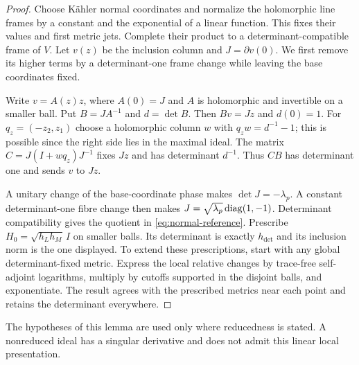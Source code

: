 \begin{proof}
Choose K\"ahler normal coordinates and normalize the
holomorphic line frames by a constant and the exponential of a
linear function. This fixes their values and first metric jets.
Complete their product to a determinant-compatible frame of $V$.
Let $v(z)$ be the inclusion column and $J=\partial v(0)$.
We first remove its higher terms by a determinant-one frame
change while leaving the base coordinates fixed.

Write $v=A(z)z$, where $A(0)=J$ and $A$ is holomorphic and
invertible on a smaller ball. Put $B=JA^{-1}$ and $d=\det B$.
Then $Bv=Jz$ and $d(0)=1$. For $q_z=(-z_2,z_1)$ choose a
holomorphic column $w$ with $q_zw=d^{-1}-1$; this is possible
since the right side lies in the maximal ideal. The matrix
$C=J(I+wq_z)J^{-1}$ fixes $Jz$ and has determinant $d^{-1}$.
Thus $CB$ has determinant one and sends $v$ to $Jz$.

A unitary change of the base-coordinate phase makes
$\det J=-\lambda_p$. A constant determinant-one fibre change
then makes $J=\sqrt{\lambda_p}\operatorname{diag}(1,-1)$.
Determinant compatibility gives the quotient in
\eqref{eq:normal-reference}. Prescribe $H_0=\sqrt{h_Lh_M}\,I$
on smaller balls. Its determinant is exactly $h_{\det}$ and its
inclusion norm is the one displayed. To extend these prescriptions,
start with any global determinant-fixed metric. Express the local
relative changes by trace-free self-adjoint logarithms, multiply
by cutoffs supported in the disjoint balls, and exponentiate.
The result agrees with the prescribed metrics near each point
and retains the determinant everywhere.
\end{proof}

The hypotheses of this lemma are used only where reducedness is
stated. A nonreduced ideal has a singular derivative and does not
admit this linear local presentation.
